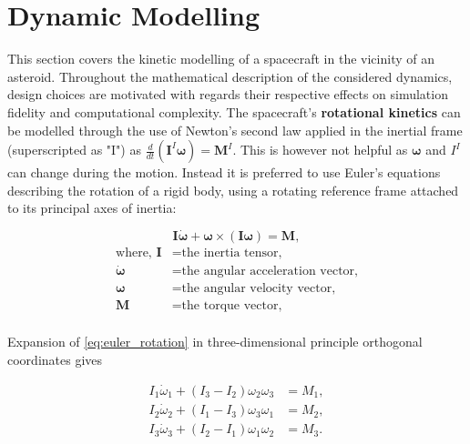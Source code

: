 \chapter{Dynamic Modelling}

This section covers the kinetic modelling of a spacecraft in the vicinity of an
asteroid. Throughout the mathematical description of the considered dynamics,
design choices are motivated with regards their respective effects on simulation
fidelity and computational complexity. The spacecraft's \textbf{rotational
kinetics} can be modelled through the use of Newton's second law applied in the
inertial frame (superscripted as "I") as
$\frac{d}{dt}(\mathbf{I}^I\mathbf{\omega})=\mathbf{M}^I$. This is however not
helpful as $\mathbf{\omega}$ and $I^I$ can change during the motion. Instead it
is preferred to use Euler's equations describing the rotation of a rigid body,
using a rotating reference frame attached to its principal axes of inertia:

\begin{equation}
{\displaystyle \mathbf {I} {\dot {\boldsymbol {\omega }}}+{\boldsymbol {\omega }}\times \left(\mathbf {I} {\boldsymbol {\omega }}\right)=\mathbf {M},}
    \label{eq:euler_rotation}
\end{equation}
\begin{equation*}
    \begin{aligned}
        \textrm{where, }
        \mathbf{I} &= \textrm{the inertia tensor,}\\
        \dot{\mathbf{\omega}} &= \textrm{the angular acceleration vector,}\\
        \mathbf{\omega} &= \textrm{the angular velocity vector,}\\
        \mathbf{M} &= \textrm{the torque vector,}\\
    \end{aligned}
\end{equation*}

Expansion of \autoref{eq:euler_rotation} in three-dimensional principle orthogonal coordinates gives

\begin{equation}
{\begin{aligned}
     I_{1}{\dot  {\omega }}_{{1}}+(I_{3}-I_{2})\omega _{2}\omega _{3}&=M_{{1}},\\I_{2}{\dot  {\omega }}_{{2}}+(I_{1}-I_{3})\omega _{3}\omega _{1}&=M_{{2}},\\I_{3}{\dot  {\omega }}_{{3}}+(I_{2}-I_{1})\omega _{1}\omega _{2}&=M_{{3}}.
\end{aligned}}
\end{equation}


